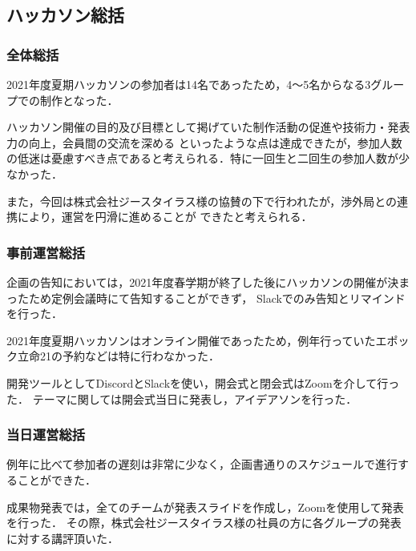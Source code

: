 \subsection*{ハッカソン総括}


\subsubsection*{全体総括}

2021年度夏期ハッカソンの参加者は14名であったため，4〜5名からなる3グループでの制作となった．

ハッカソン開催の目的及び目標として掲げていた制作活動の促進や技術力・発表力の向上，会員間の交流を深める
といったような点は達成できたが，参加人数の低迷は憂慮すべき点であると考えられる．特に一回生と二回生の参加人数が少なかった．

また，今回は株式会社ジースタイラス様の協賛の下で行われたが，渉外局との連携により，運営を円滑に進めることが
できたと考えられる．

\subsubsection*{事前運営総括}

企画の告知においては，2021年度春学期が終了した後にハッカソンの開催が決まったため定例会議時にて告知することができず，
Slackでのみ告知とリマインドを行った．

2021年度夏期ハッカソンはオンライン開催であったため，例年行っていたエポック立命21の予約などは特に行わなかった．

開発ツールとしてDiscordとSlackを使い，開会式と閉会式はZoomを介して行った．
テーマに関しては開会式当日に発表し，アイデアソンを行った．

\subsubsection*{当日運営総括}

例年に比べて参加者の遅刻は非常に少なく，企画書通りのスケジュールで進行することができた．

成果物発表では，全てのチームが発表スライドを作成し，Zoomを使用して発表を行った．
その際，株式会社ジースタイラス様の社員の方に各グループの発表に対する講評頂いた．
